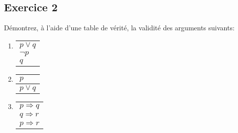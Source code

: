 % 
% 
% 


% 
% 


\subsection*{Exercice 2}
Démontrez, à l'aide d'une table de vérité, la validité des arguments suivants:

\begin{enumerate}
	\item \enter
	
	\begin{flushleft}
	\begin{tabular}{l}
		$p \vee q$ \\
		$\neg p$ \\
	\hline
	$q$
	\end{tabular}
\end{flushleft}

	
	\item \enter
	
	\begin{flushleft}
	\begin{tabular}{l}
		$p$ \\
		\hline
	$p \vee q$
	\end{tabular}
	
\end{flushleft}

	\item \enter
	
	\begin{flushleft}
	\begin{tabular}{l}
		$p \Rightarrow q$ \\
		$q \Rightarrow r$ \\
	\hline
	$p \Rightarrow r$
	\end{tabular}
	
\end{flushleft}

\end{enumerate}

